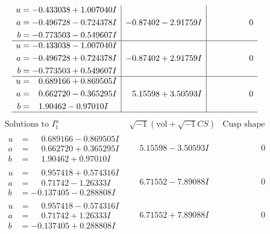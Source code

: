 \documentclass[1p]{elsarticle_modified}
\theoremstyle{definition}
\newcommand{\I}{\sqrt{-1}}
\begin{document}
$$\begin{array}{c|c|c}
\begin{aligned}
u &= -0.433038 + 1.007040 I \\
a &= -0.496728 - 0.724378 I \\
b &= -0.773503 - 0.549607 I\end{aligned}
 & -0.87402 - 2.91759 I & \phantom{-0.000000 } 0 \\ \hline\begin{aligned}
u &= -0.433038 - 1.007040 I \\
a &= -0.496728 + 0.724378 I \\
b &= -0.773503 + 0.549607 I\end{aligned}
 & -0.87402 + 2.91759 I & \phantom{-0.000000 } 0 \\ \hline\begin{aligned}
u &= \phantom{-}0.689166 + 0.869505 I \\
a &= \phantom{-}0.662720 - 0.365295 I \\
b &= \phantom{-}1.90462 - 0.97010 I\end{aligned}
 & \phantom{-}5.15598 + 3.50593 I & \phantom{-0.000000 } 0\\
 \hline 
 \end{array}$$\newpage$$\begin{array}{c|c|c}  
\text{Solutions to }I^u_{1}& \I (\text{vol} + \sqrt{-1}CS) & \text{Cusp shape}\\
 \hline 
\begin{aligned}
u &= \phantom{-}0.689166 - 0.869505 I \\
a &= \phantom{-}0.662720 + 0.365295 I \\
b &= \phantom{-}1.90462 + 0.97010 I\end{aligned}
 & \phantom{-}5.15598 - 3.50593 I & \phantom{-0.000000 } 0 \\ \hline\begin{aligned}
u &= \phantom{-}0.957418 + 0.574316 I \\
a &= \phantom{-}0.71742 - 1.26333 I \\
b &= -0.137405 - 0.288808 I\end{aligned}
 & \phantom{-}6.71552 - 7.89088 I & \phantom{-0.000000 } 0 \\ \hline\begin{aligned}
u &= \phantom{-}0.957418 - 0.574316 I \\
a &= \phantom{-}0.71742 + 1.26333 I \\
b &= -0.137405 + 0.288808 I\end{aligned}
 & \phantom{-}6.71552 + 7.89088 I & \phantom{-0.000000 } 0 \\ \hline\begin{aligned}

\end{aligned}
\end{array}$$
\end{document}
